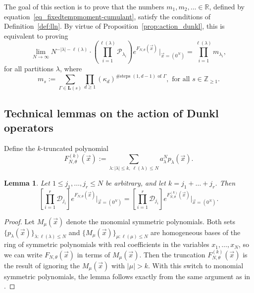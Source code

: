 \documentclass[11pt]{article}
\theoremstyle{plain}
\newtheorem{lemma}{Lemma}[section]
\renewcommand{\P}{\mathcal P}
\newcommand{\D}{\mathcal D}
\newcommand{\Z}{\mathbb Z}
\newcommand{\R}{\mathbb R}
\newcommand{\Luk}{\mathbf L}
\newcommand{\la}{\lambda}
\newcommand{\vecx}{\vec{x}}
\newcommand{\zeroes}{\vec{x}=(0^N)}
\begin{document}
The goal of this section is to prove that the numbers $m_1,m_2,\dots\in\R$, defined by equation~\eqref{eq_fixedtempmoment-cumulant}, satisfy the conditions of Definition~\ref{def:lln}.
By virtue of Proposition~\ref{prop:action_dunkl}, this is equivalent to proving
\begin{equation}\label{eqn:goal_section_4}
\lim_{N\to\infty}{ N^{-|\la|-\ell(\la)}\cdot \left( \prod_{i=1}^{\ell(\la)} \P_{\la_i} \right) e^{F_{N,\theta}(\vecx)} \,\bigg|_{\vecx=(0^N)} } = \prod_{i=1}^{\ell(\la)}{m_{\la_i}},
\end{equation}
for all partitions $\la$, where 
\begin{equation}\label{eq:luk_expression}
m_s := \sum_{\Gamma\in\Luk(s)}{ \prod_{d\ge 1}{(\kappa_d)^{\#\text{steps $(1,d-1)$ of }\Gamma}} },\text{ for all } s\in\Z_{\ge 1}.
\end{equation}



\subsection{Technical lemmas on the action of Dunkl operators}


Define the $k$-truncated polynomial
\[
F^{(k)}_{N,\theta}(\vecx) := \sum_{\la\colon |\la|\le k,\ \ell(\la)\le N}{a_\la^N p_\la(\vecx)}.
\]


\begin{lemma}\label{lem:tech_1}
    Let $1\le j_1,\dots,j_r\le N$ be arbitrary, and let $k=j_1+\dots+j_r$. Then
    \[
    \left[ \prod_{i=1}^r\D_{j_i} \right] e^{F_{N,\theta}(\vecx)} \Big|_{\zeroes} = \left[ \prod_{i=1}^r\D_{j_i} \right] e^{F^{(k)}_{N,\theta}(\vecx) } \Big|_{\zeroes}.
    \]
\end{lemma}
\begin{proof}
    Let $M_\mu(\vecx)$ denote the monomial symmetric polynomials.
    Both sets $\{p_\la(\vecx)\}_{\la\colon\ell(\la)\le N}$ and $\{M_\mu(\vecx)\}_{\mu\colon\ell(\mu)\le N}$ are homogeneous bases of the ring of symmetric polynomials with real coefficients in the variables $x_1,\dots,x_N$, so we can write $F_{N,\theta}(\vecx)$ in terms of $M_\mu(\vecx)$.
    Then the truncation $F_{N,\theta}^{(k)}(\vecx)$ is the result of ignoring the $M_\mu(\vecx)$ with $|\mu|>k$.
    With this switch to monomial symmetric polynomials, the lemma follows exactly from the same argument as in \cite[Lemma~5.2]{BCG}.
\end{proof}
\end{document}
